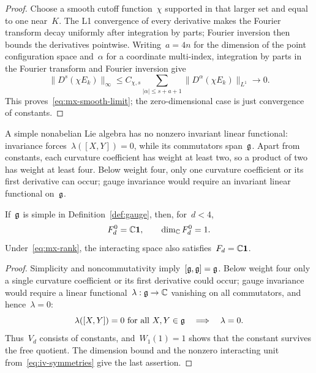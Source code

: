 \begin{proof}
Choose a smooth cutoff function~$\chi$ supported in that larger set and equal to one near~$K$. The L1 convergence of every derivative makes the Fourier transform decay uniformly after integration by parts; Fourier inversion then bounds the derivatives pointwise.
Writing~$a=4n$ for the dimension of the point configuration space and~$\alpha$ for a coordinate multi-index, integration by parts in the Fourier transform and Fourier inversion give
\begin{equation*}
 \|D^s(\chi E_k)\|_\infty
 \le C_{\chi,s}\sum_{|\alpha|\le s+a+1}
       \|D^\alpha(\chi E_k)\|_{L^1}\longrightarrow0.
\end{equation*}
This proves~\eqref{eq:mx-smooth-limit}; the zero-dimensional case is just convergence of constants.
\end{proof}

A simple nonabelian Lie algebra has no nonzero invariant linear functional: invariance forces~$\lambda([X,Y])=0$, while its commutators span~$\mathfrak g$.
Apart from constants, each curvature coefficient has weight at least two, so a product of two has weight at least four. Below weight four, only one curvature coefficient or its first derivative can occur; gauge invariance would require an invariant linear functional on~$\mathfrak g$.

\begin{corollary}\label{cor:mx-low}
If~$\mathfrak g$ is simple in Definition~\ref{def:gauge}, then, for~$d<4$,
\begin{equation}\label{eq:mx-low}
 F_d^0=\mathbb C\mathbf1,\qquad \dim_\mathbb C F_d^0=1.
\end{equation}
Under~\eqref{eq:mx-rank}, the interacting space also satisfies~$F_d=\mathbb C\mathbf1$.
\end{corollary}

\begin{proof}
Simplicity and noncommutativity imply~$[\mathfrak g,\mathfrak g]=\mathfrak g$. Below weight four only a single curvature coefficient or its first derivative could occur; gauge invariance would require a linear functional~$\lambda:\mathfrak g\to\mathbb C$ vanishing on all commutators, and hence~$\lambda=0$:
\begin{equation*}
 \lambda([X,Y])=0\ \text{for all }X,Y\in\mathfrak g
 \quad\Longrightarrow\quad\lambda=0.
\end{equation*}
Thus~$V_d$ consists of constants, and~$W_1(1)=1$ shows that the constant survives the free quotient.
The dimension bound and the nonzero interacting unit from~\eqref{eq:iv-symmetries} give the last assertion.
\end{proof}

